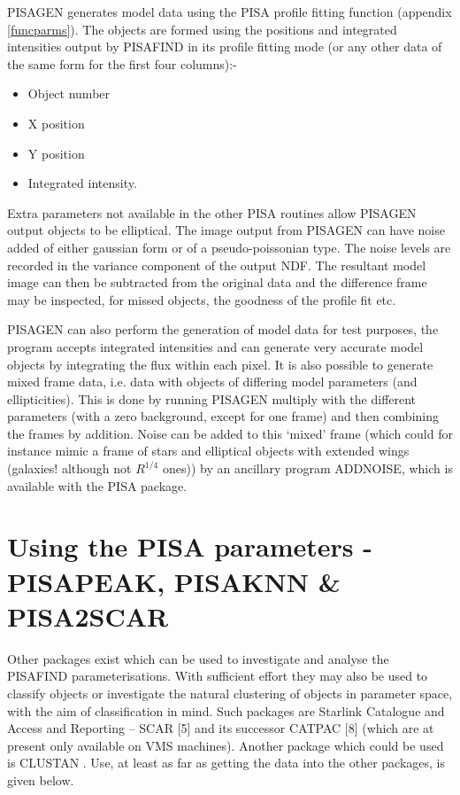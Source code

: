 PISAGEN generates model data using the PISA profile fitting function
(appendix \ref{funcparms}). The objects are formed using the positions
and integrated intensities output by PISAFIND in its profile
fitting mode (or any other data of the same form for the first four
columns):- 
\begin{itemize}
\item Object number
\item X position
\item Y position
\item Integrated intensity.
\end{itemize}
Extra parameters not available in the other PISA routines allow  PISAGEN
output objects to be elliptical. The image output from PISAGEN can have
noise added of either gaussian form or of a pseudo-poissonian type. The
noise levels are recorded in the variance component of the output NDF.
The resultant model image can then be subtracted from the original data
and the difference frame may be inspected, for missed objects, the
goodness of the profile fit etc.

PISAGEN can also perform the generation of model data for test purposes,
the program accepts integrated intensities and can generate very
accurate model objects by integrating the flux within each pixel. It is
also possible to generate mixed frame data, i.e. data with objects of
differing model parameters (and ellipticities). This is done by running
PISAGEN multiply with the different parameters (with a zero background,
except for one frame) and then combining the frames by addition. Noise
can be added to this `mixed' frame (which could for instance mimic a
frame of stars and elliptical objects with extended wings (galaxies!
although not $R^{1/4}$ ones)) by an ancillary program ADDNOISE, which is
available with the PISA package. 

\section{Using the PISA parameters - PISAPEAK, PISAKNN \& PISA2SCAR}

Other packages exist which can be used to investigate and analyse the
PISAFIND parameterisations. With sufficient effort they may also be used
to classify objects or investigate the natural clustering of objects in
parameter space, with the aim of classification in mind. Such  packages
are Starlink Catalogue and Access and Reporting -- SCAR [5] and its
successor CATPAC [8] (which are at present only available on VMS
machines). Another package which could be used is CLUSTAN .
Use, at least as far as getting the data into the other packages, is
given below.

